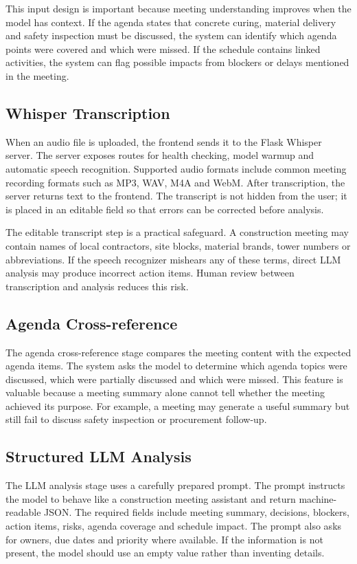 \documentclass[11pt,a4paper]{article}
\begin{document}
This input design is important because meeting understanding improves when the model has context. If the agenda states that concrete curing, material delivery and safety inspection must be discussed, the system can identify which agenda points were covered and which were missed. If the schedule contains linked activities, the system can flag possible impacts from blockers or delays mentioned in the meeting.

\subsection{Whisper Transcription}

When an audio file is uploaded, the frontend sends it to the Flask Whisper server. The server exposes routes for health checking, model warmup and automatic speech recognition. Supported audio formats include common meeting recording formats such as MP3, WAV, M4A and WebM. After transcription, the server returns text to the frontend. The transcript is not hidden from the user; it is placed in an editable field so that errors can be corrected before analysis.

The editable transcript step is a practical safeguard. A construction meeting may contain names of local contractors, site blocks, material brands, tower numbers or abbreviations. If the speech recognizer mishears any of these terms, direct LLM analysis may produce incorrect action items. Human review between transcription and analysis reduces this risk.

\subsection{Agenda Cross-reference}

The agenda cross-reference stage compares the meeting content with the expected agenda items. The system asks the model to determine which agenda topics were discussed, which were partially discussed and which were missed. This feature is valuable because a meeting summary alone cannot tell whether the meeting achieved its purpose. For example, a meeting may generate a useful summary but still fail to discuss safety inspection or procurement follow-up.

\subsection{Structured LLM Analysis}

The LLM analysis stage uses a carefully prepared prompt. The prompt instructs the model to behave like a construction meeting assistant and return machine-readable JSON. The required fields include meeting summary, decisions, blockers, action items, risks, agenda coverage and schedule impact. The prompt also asks for owners, due dates and priority where available. If the information is not present, the model should use an empty value rather than inventing details.
\end{document}
